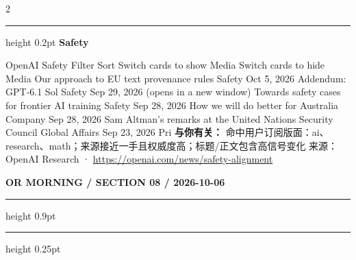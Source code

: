 \documentclass[10.5pt]{ctexart}
\begin{document}
\begin{multicols}{2}
\vspace{2mm}
\hrule height 0.2pt
\vspace{2mm}
{\large\bfseries Safety}\par
OpenAI Safety Filter Sort Switch cards to show Media Switch cards to hide Media Our approach to EU text provenance rules Safety Oct 5, 2026 Addendum: GPT‑6.1 Sol Safety Sep 29, 2026 (opens in a new window) Towards safety cases for frontier AI training Safety Sep 28, 2026 How we will do better for Australia Company Sep 28, 2026 Sam Altman’s remarks at the United Nations Security Council Global Affairs Sep 23, 2026 Pri
\textbf{与你有关：} 命中用户订阅版面：ai、research、math；来源接近一手且权威度高；标题/正文包含高信号变化
{\footnotesize\color{ormuted} 来源：OpenAI Research · \url{https://openai.com/news/safety-alignment}}
\end{multicols}
\newpage
{\small\bfseries OR MORNING / SECTION 08 / 2026-10-06}
\vspace{2mm}
\hrule height 0.9pt
\vspace{1.5mm}
\hrule height 0.25pt
\vspace{4mm}
\end{document}
